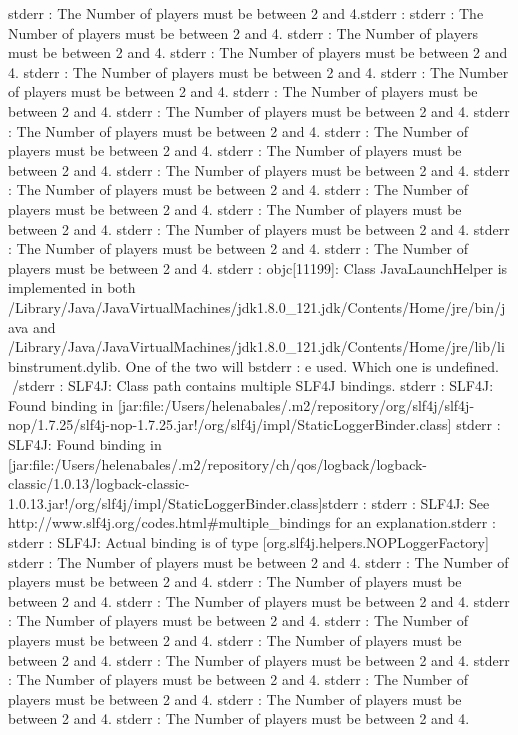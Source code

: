 stderr  : The Number of players must be between 2 and 4.stderr  : 
stderr  : The Number of players must be between 2 and 4.
stderr  : The Number of players must be between 2 and 4.
stderr  : The Number of players must be between 2 and 4.
stderr  : The Number of players must be between 2 and 4.
stderr  : The Number of players must be between 2 and 4.
stderr  : The Number of players must be between 2 and 4.
stderr  : The Number of players must be between 2 and 4.
stderr  : The Number of players must be between 2 and 4.
stderr  : The Number of players must be between 2 and 4.
stderr  : The Number of players must be between 2 and 4.
stderr  : The Number of players must be between 2 and 4.
stderr  : The Number of players must be between 2 and 4.
stderr  : The Number of players must be between 2 and 4.
stderr  : The Number of players must be between 2 and 4.
stderr  : The Number of players must be between 2 and 4.
stderr  : The Number of players must be between 2 and 4.
stderr  : The Number of players must be between 2 and 4.
stderr  : objc[11199]: Class JavaLaunchHelper is implemented in both /Library/Java/JavaVirtualMachines/jdk1.8.0_121.jdk/Contents/Home/jre/bin/java and /Library/Java/JavaVirtualMachines/jdk1.8.0_121.jdk/Contents/Home/jre/lib/libinstrument.dylib. One of the two will bstderr  : e used. Which one is undefined.
/stderr  : SLF4J: Class path contains multiple SLF4J bindings.
stderr  : SLF4J: Found binding in [jar:file:/Users/helenabales/.m2/repository/org/slf4j/slf4j-nop/1.7.25/slf4j-nop-1.7.25.jar!/org/slf4j/impl/StaticLoggerBinder.class]
stderr  : SLF4J: Found binding in [jar:file:/Users/helenabales/.m2/repository/ch/qos/logback/logback-classic/1.0.13/logback-classic-1.0.13.jar!/org/slf4j/impl/StaticLoggerBinder.class]stderr  : 
stderr  : SLF4J: See http://www.slf4j.org/codes.html#multiple_bindings for an explanation.stderr  : 
stderr  : SLF4J: Actual binding is of type [org.slf4j.helpers.NOPLoggerFactory]
stderr  : The Number of players must be between 2 and 4.
stderr  : The Number of players must be between 2 and 4.
stderr  : The Number of players must be between 2 and 4.
stderr  : The Number of players must be between 2 and 4.
stderr  : The Number of players must be between 2 and 4.
stderr  : The Number of players must be between 2 and 4.
stderr  : The Number of players must be between 2 and 4.
stderr  : The Number of players must be between 2 and 4.
stderr  : The Number of players must be between 2 and 4.
stderr  : The Number of players must be between 2 and 4.
stderr  : The Number of players must be between 2 and 4.
stderr  : The Number of players must be between 2 and 4.
